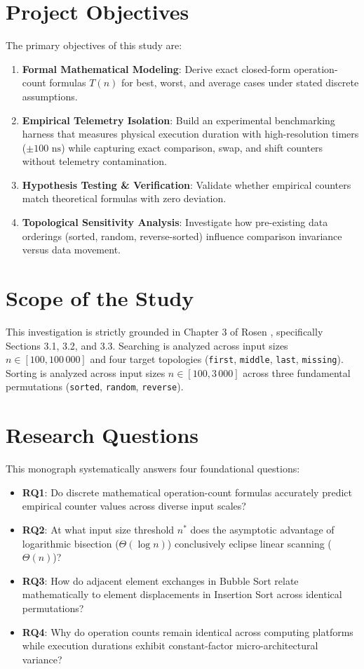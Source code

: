 \documentclass[11pt,a4paper,oneside]{report}
\theoremstyle{definition}
\begin{document}
\section{Project Objectives}
The primary objectives of this study are:
\begin{enumerate}
    \item \textbf{Formal Mathematical Modeling}: Derive exact closed-form operation-count formulas $T(n)$ for best, worst, and average cases under stated discrete assumptions.
    \item \textbf{Empirical Telemetry Isolation}: Build an experimental benchmarking harness that measures physical execution duration with high-resolution timers ($\pm 100\text{ ns}$) while capturing exact comparison, swap, and shift counters without telemetry contamination.
    \item \textbf{Hypothesis Testing \& Verification}: Validate whether empirical counters match theoretical formulas with zero deviation.
    \item \textbf{Topological Sensitivity Analysis}: Investigate how pre-existing data orderings (sorted, random, reverse-sorted) influence comparison invariance versus data movement.
\end{enumerate}

\section{Scope of the Study}
This investigation is strictly grounded in Chapter 3 of Rosen \cite{rosen2019discrete}, specifically Sections 3.1, 3.2, and 3.3. Searching is analyzed across input sizes $n \in [100, 100\,000]$ and four target topologies (\texttt{first}, \texttt{middle}, \texttt{last}, \texttt{missing}). Sorting is analyzed across input sizes $n \in [100, 3\,000]$ across three fundamental permutations (\texttt{sorted}, \texttt{random}, \texttt{reverse}).

\section{Research Questions}
This monograph systematically answers four foundational questions:
\begin{itemize}
    \item \textbf{RQ1}: Do discrete mathematical operation-count formulas accurately predict empirical counter values across diverse input scales?
    \item \textbf{RQ2}: At what input size threshold $n^*$ does the asymptotic advantage of logarithmic bisection ($\Theta(\log n)$) conclusively eclipse linear scanning ($\Theta(n)$)?
    \item \textbf{RQ3}: How do adjacent element exchanges in Bubble Sort relate mathematically to element displacements in Insertion Sort across identical permutations?
    \item \textbf{RQ4}: Why do operation counts remain identical across computing platforms while execution durations exhibit constant-factor micro-architectural variance?
\end{itemize}
\end{document}
